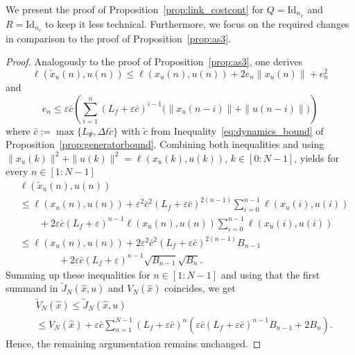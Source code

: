 \documentclass{article}
\numberwithin{equation}{section}
\newcommand{\nx}{n_x}
\newcommand{\nc}{n_c}
\begin{document}
	We present the proof of Proposition~\ref{prop:link_costcont} for $Q = \mathrm{Id}_{\nx}$ and $R = \mathrm{Id}_{\nc}$ to keep it less technical. Furthermore, we focus on the required changes in comparison to the proof of Proposition~\ref{prop:as3}.
	\begin{proof}
		Analogously to the proof of Proposition~\ref{prop:as3}, one derives
		\begin{equation}\nonumber   
		\ell(\tilde{x}_u(n), u(n)) \leq \ell(x_u(n), u(n)) + 2 e_n \| x_u(n) \| + e_n^2
		\end{equation}
		and 
		\begin{equation}\nonumber
		e_n \leq \varepsilon\bar{c} \left( \sum_{i=1}^n (L_f + \varepsilon\bar{c})^{i-1} \big(\| x_u(n-i) \|+ \|u(n-i)\| \big) \right)
		\end{equation}
		where {$\bar c :=\max\{L_\Psi,\Delta t\tilde c\}$ with $\tilde c$ from Inequality~\eqref{eq:dynamics_bound} of Proposition~\ref{prop:generatorbound}.}
		Combining both inequalities and using $\| x_u(k) \|^2 + \|u(k)\|^2 = \ell(x_u(k),u(k))$, $k \in [0:N-1]$, yields for every $n\in [1:N-1]$ %
		\begin{align*}
		& \ell(\tilde{x}_u(n), u(n)) \\& \leq \ell(x_u(n),u(n)) + \varepsilon^2 \bar{c}^2(L_f + \varepsilon \bar{c})^{2(n-1)} \sum_{i=0}^{n-1} \ell(x_u(i),u(i)) 
		\\[-.8em]& \qquad  + 2 \varepsilon\bar{c} (L_f + \varepsilon)^{n-1} \ell(x_u(n),u(n)) \sum_{i=0}^{n-1} \ell(x_u(i),u(i)) \\%
		& \leq \ell(x_u(n),u(n)) + 2\varepsilon^2\bar{c}^2 (L_f + \varepsilon \bar{c})^{2(n-1)} B_{n-1} 
		\\&\qquad \qquad + 2 \varepsilon\bar{c} (L_f + \varepsilon)^{n-1} \sqrt{B_{n-1}} \sqrt{B_n}. 
		\end{align*}
		Summing up these inequalities for $n\in [1:N-1]$ and using that the first summand in $\tilde{J}_N(\hat{x},u)$ and $V_N(\hat{x})$ coincides, we get %
		\begin{align*}
		&\tilde{V}_N(\hat{x}) \leq \tilde{J}_N(\hat{x},u) 
		\\&\leq V_N(\hat{x}) + \varepsilon\bar{c} \sum_{n=1}^{N-1} (L_f + \varepsilon \bar{c})^{n} \left( \varepsilon \bar{c} (L_f + \varepsilon \bar{c})^{n-1} B_{n-1} + 2 B_n \right).
		\end{align*}
		Hence, the remaining argumentation remains unchanged.
	\end{proof}
	
	
	
\end{document}
